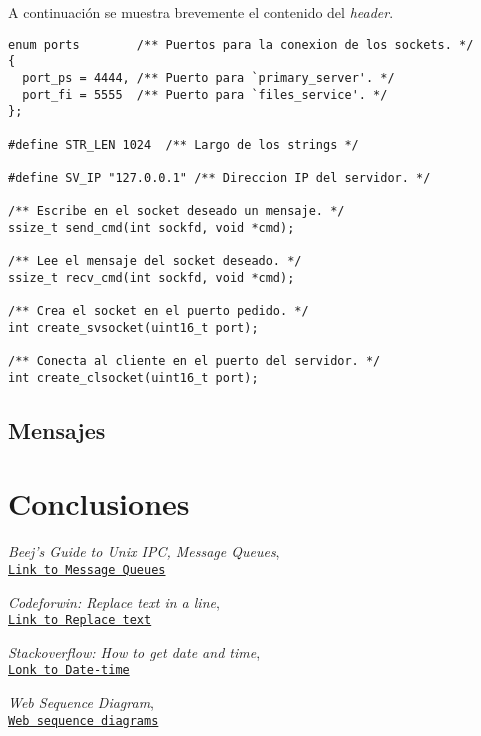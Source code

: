 \documentclass[12pt,a4paper]{article}
\begin{document}
A continuación se muestra brevemente el contenido del \emph{header}.

\begin{lstlisting}[caption={\emph{Header} para el uso de \emph{sockets}.}, label={socket}, language=Ce]
enum ports        /** Puertos para la conexion de los sockets. */
{
  port_ps = 4444, /** Puerto para `primary_server'. */
  port_fi = 5555  /** Puerto para `files_service'. */
};

#define STR_LEN 1024  /** Largo de los strings */

#define SV_IP "127.0.0.1" /** Direccion IP del servidor. */

/** Escribe en el socket deseado un mensaje. */
ssize_t send_cmd(int sockfd, void *cmd);

/** Lee el mensaje del socket deseado. */
ssize_t recv_cmd(int sockfd, void *cmd);

/** Crea el socket en el puerto pedido. */
int create_svsocket(uint16_t port);

/** Conecta al cliente en el puerto del servidor. */
int create_clsocket(uint16_t port);
\end{lstlisting}

\subsection{Mensajes}
\label{msg_h}



\section{Conclusiones}
\label{conc}


\begin{thebibliography}{9}
\emph{Beej's Guide to Unix IPC, Message Queues},
\\\texttt{\href{https://beej.us/guide/bgipc/html/multi/mq.html}{Link to Message Queues}}


\emph{Codeforwin: Replace text in a line},
\\\texttt{\href{https://codeforwin.org/2018/02/c-program-replace-specific-line-a-text-file.html}
{Link to Replace text}}


\emph{Stackoverflow: How to get date and time},
\\\texttt{\href{https://stackoverflow.com/questions/1442116/how-to-get-the-date-and-time-values-in-a-c-program}
{Lonk to Date-time}}

\emph{Web Sequence Diagram},
\\\texttt{\href{https://www.websequencediagrams.com/}{Web sequence diagrams}}
\end{thebibliography}
\end{document}
